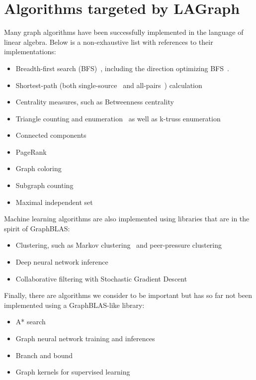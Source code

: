 \section{Algorithms targeted by LAGraph}
\label{sec:algorithms}

Many graph algorithms have been successfully implemented in the language of linear algebra. Below is a non-exhaustive list with references to their implementations:

\begin{itemize}
\item Breadth-first search (BFS)~\cite{bulucc2011parallel, gbtl-cuda16, Davis19}, including the direction optimizing BFS~\cite{Yang:2018:IPE}.
\item Shortest-path (both single-source~\cite{Yang:2019:GBL, ssspgrapl19} and all-pairs~\cite{ca_apsp}) calculation
\item Centrality measures, such as Betweenness centrality~\cite{combblas}
\item Triangle counting and enumeration~\cite{} as well as k-truss enumeration~\cite{}
\item Connected components~\cite{lacc2019}
\item PageRank~\cite{satish2014navigating}
\item Graph coloring~\cite{}
\item Subgraph counting~\cite{chen2019graphblas}
\item Maximal independent set~\cite{jpdc15, Yang:2019:GBL}
\end{itemize}

Machine learning algorithms are also implemented using libraries that are in the spirit of GraphBLAS:
\begin{itemize}
\item Clustering, such as Markov clustering~\cite{azad2018hipmcl} and peer-pressure clustering~\cite{}
\item Deep neural network inference~\cite{kepner2017enabling}
\item Collaborative filtering with Stochastic Gradient Descent~\cite{satish2014navigating}
\end{itemize}

Finally, there are algorithms we consider to be important but has so far not been implemented using a GraphBLAS-like library:
\begin{itemize}
\item A* search
\item Graph neural network training and inferences
\item Branch and bound
\item Graph kernels for supervised learning
\end{itemize}
